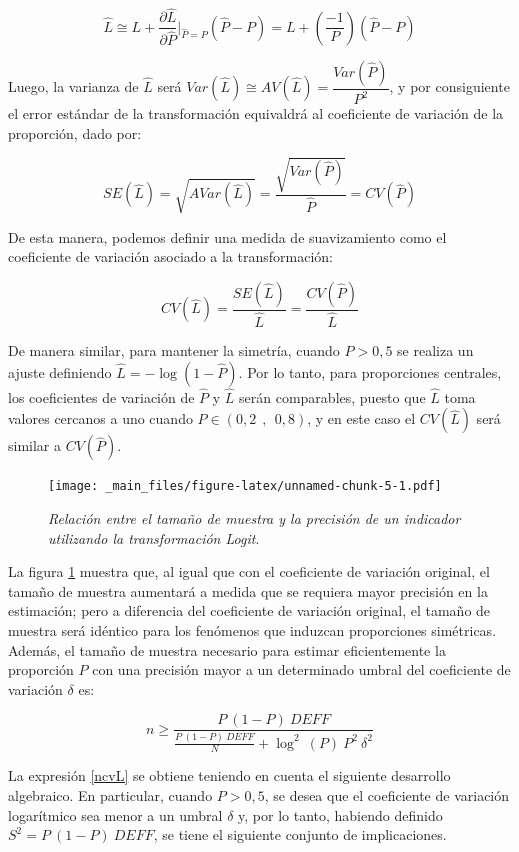\documentclass[
  12pt,
  spanish,
]{book}
\begin{document}
\[
\hat{L} \cong L + \frac{\partial \hat{L}}{\partial \hat{P}}\biggr\rvert_{\hat{P}=P} (\hat{P}-P) = L + \left(\frac{-1}{P}\right)(\hat{P}-P)
\]

Luego, la varianza de \(\hat{L}\) será \(Var(\hat{L})\cong AV(\hat{L}) = \dfrac{Var(\hat{P})}{P^2}\), y por consiguiente el error estándar de la transformación equivaldrá al coeficiente de variación de la proporción, dado por:

\[
SE(\hat{L}) = \sqrt{AVar(\hat{L})} = \dfrac{\sqrt{Var(\hat{P})}}{\hat{P}} = CV(\hat{P}) 
\]

De esta manera, podemos definir una medida de suavizamiento como el coeficiente de variación asociado a la transformación:

\[
CV(\hat{L}) = \dfrac{SE(\hat{L})}{\hat{L}} = \dfrac{CV(\hat{P})}{\hat{L}}
\]

De manera similar, para mantener la simetría, cuando \(P>0,5\) se realiza un ajuste definiendo \(\hat{L} = -\log(1-\hat{P})\). Por lo tanto, para proporciones centrales, los coeficientes de variación de \(\hat{P}\) y \(\hat{L}\) serán comparables, puesto que \(\hat{L}\) toma valores cercanos a uno cuando \(P \in (0,2\ \ ,\ \ 0,8)\), y en este caso el \(CV(\hat{L})\) será similar a \(CV(\hat{P})\).

\begin{figure}
\centering
\texttt{[image: \_main\_files/figure-latex/unnamed-chunk-5-1.pdf]}
\caption{\label{fig:unnamed-chunk-5}\label{fig1}\emph{Relación entre el tamaño de muestra y la precisión de un indicador utilizando la transformación Logit}.}
\end{figure}

La figura \ref{fig1} muestra que, al igual que con el coeficiente de variación original, el tamaño de muestra aumentará a medida que se requiera mayor precisión en la estimación; pero a diferencia del coeficiente de variación original, el tamaño de muestra será idéntico para los fenómenos que induzcan proporciones simétricas. Además, el tamaño de muestra necesario para estimar eficientemente la proporción \(P\) con una precisión mayor a un determinado umbral del coeficiente de variación \(\delta\) es:

\begin{equation}
\label{ncvL}
n \geq \dfrac{P \ (1-P) \  DEFF}{\frac{P \  (1-P) \ DEFF}{N}+\log^2\ (P) \ P^2 \ \delta^2}
\end{equation}

La expresión \eqref{ncvL} se obtiene teniendo en cuenta el siguiente desarrollo algebraico. En particular, cuando \(P > 0,5\), se desea que el coeficiente de variación logarítmico sea menor a un umbral \(\delta\) y, por lo tanto, habiendo definido \(S^2 = P\ (1-P) \  DEFF\), se tiene el siguiente conjunto de implicaciones.
\end{document}
